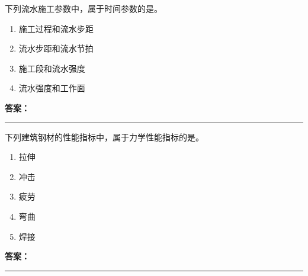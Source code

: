 \documentclass[UTF8,fontset=fandol,11pt]{ctexart}
\newcommand{\answerline}{\textcolor{answerred}{\rule{2.4cm}{0.7pt}}}
\begin{document}
\vspace{0.2em}

\begin{quizbox}[title={乱序第 219 题｜第十章流水施工原理}]

下列流水施工参数中，属于时间参数的是。\\

\begin{enumerate}[label=\Alph*.]

\item 施工过程和流水步距

\item 流水步距和流水节拍

\item 施工段和流水强度

\item 流水强度和工作面

\end{enumerate}

\textbf{\textcolor{answerred}{答案：}} \answerline

\end{quizbox}

\vspace{0.2em}

\begin{quizbox}[title={乱序第 220 题｜第四章混凝土结构工程}]

下列建筑钢材的性能指标中，属于力学性能指标的是。\\

\begin{enumerate}[label=\Alph*.]

\item 拉伸

\item 冲击

\item 疲劳

\item 弯曲

\item 焊接

\end{enumerate}

\textbf{\textcolor{answerred}{答案：}} \answerline

\end{quizbox}

\vspace{0.2em}
\end{document}
